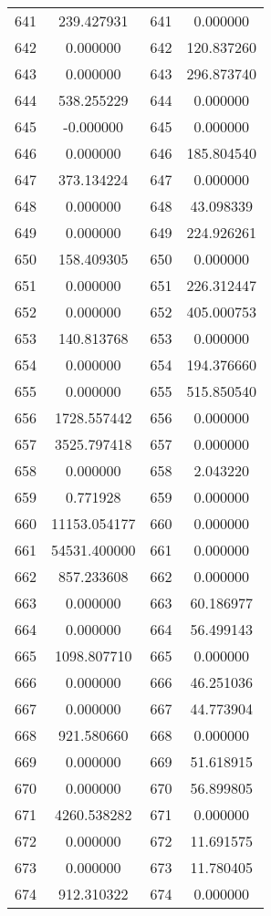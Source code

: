 \documentclass[12pt]{article}
\begin{document}
\begin{longtable}{@{}cccc@{}}
641 & 239.427931 & 641 & 0.000000 \\
642 & 0.000000 & 642 & 120.837260 \\
643 & 0.000000 & 643 & 296.873740 \\
644 & 538.255229 & 644 & 0.000000 \\
645 & -0.000000 & 645 & 0.000000 \\
646 & 0.000000 & 646 & 185.804540 \\
647 & 373.134224 & 647 & 0.000000 \\
648 & 0.000000 & 648 & 43.098339 \\
649 & 0.000000 & 649 & 224.926261 \\
650 & 158.409305 & 650 & 0.000000 \\
651 & 0.000000 & 651 & 226.312447 \\
652 & 0.000000 & 652 & 405.000753 \\
653 & 140.813768 & 653 & 0.000000 \\
654 & 0.000000 & 654 & 194.376660 \\
655 & 0.000000 & 655 & 515.850540 \\
656 & 1728.557442 & 656 & 0.000000 \\
657 & 3525.797418 & 657 & 0.000000 \\
658 & 0.000000 & 658 & 2.043220 \\
659 & 0.771928 & 659 & 0.000000 \\
660 & 11153.054177 & 660 & 0.000000 \\
661 & 54531.400000 & 661 & 0.000000 \\
662 & 857.233608 & 662 & 0.000000 \\
663 & 0.000000 & 663 & 60.186977 \\
664 & 0.000000 & 664 & 56.499143 \\
665 & 1098.807710 & 665 & 0.000000 \\
666 & 0.000000 & 666 & 46.251036 \\
667 & 0.000000 & 667 & 44.773904 \\
668 & 921.580660 & 668 & 0.000000 \\
669 & 0.000000 & 669 & 51.618915 \\
670 & 0.000000 & 670 & 56.899805 \\
671 & 4260.538282 & 671 & 0.000000 \\
672 & 0.000000 & 672 & 11.691575 \\
673 & 0.000000 & 673 & 11.780405 \\
674 & 912.310322 & 674 & 0.000000 \\

\end{longtable}
\end{document}
